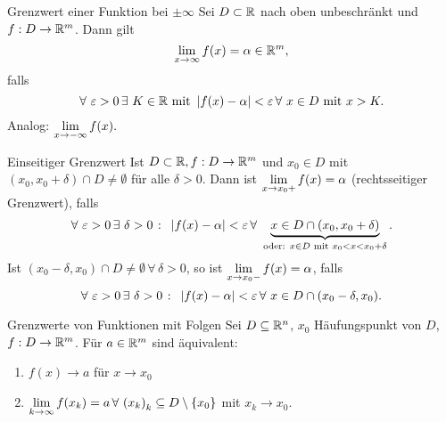 \documentclass[main.tex]{subfiles}
\begin{document}
\begin{karte}{Grenzwert einer Funktion bei \( \pm \infty \)}
    Sei \( D \subset \mathbb{R} \) nach oben unbeschränkt und 
    \( f:D\rightarrow \mathbb{R}^m \). Dann gilt 
    \[ \lim\limits_{x\rightarrow\infty} f(x) = \alpha \in \mathbb{R}^m, \]
    falls
    \[ \forall \,\varepsilon > 0 \,\exists \, K\in\R \text{ mit } 
    \abs{f(x) - \alpha} < \varepsilon \,\forall \, x \in D 
    \text{ mit } x > K. \]
    Analog: \( \lim\limits_{x\rightarrow -\infty} f(x). \)
\end{karte}
\begin{karte}{Einseitiger Grenzwert}
    Ist \( D \subset \mathbb{R}, f : D\rightarrow \mathbb{R}^m \) und \( x_0 \in D \)
    mit \( (x_0, x_0 + \delta) \cap D \neq \emptyset \) für alle 
    \( \delta > 0 \). Dann ist \( \lim\limits_{x\rightarrow x_0+} f(x) = \alpha \) 
    (rechtsseitiger Grenzwert), falls
    \[ \forall \,\varepsilon > 0 \,\exists \, \delta > 0 \;\colon \;
    \abs{ f(x) - \alpha } < \varepsilon \,\forall \, \underbrace{ x\in D \cap 
    (x_0, x_0 + \delta) }_{ \text{oder: } x\in D \text{ mit } 
    x_0 < x < x_0 + \delta }. \]
    Ist \( (x_0 - \delta, x_0) \cap D \neq \emptyset \,\forall \, 
    \delta > 0 \), so ist \( \lim\limits_{x\rightarrow x_0-} f(x) = \alpha \), falls
    \[ \forall \, \varepsilon > 0 \,\exists \, \delta > 0 \;\colon \; 
    \abs{f(x) - \alpha} < \varepsilon \,\forall \, x \in D \cap 
    (x_0 - \delta, x_0). \]
\end{karte}
\begin{karte}{Grenzwerte von Funktionen mit Folgen}
    Sei \( D \subseteq \mathbb{R}^n \), \(x_0 \) Häufungspunkt von 
    \( D \), \( f: D \rightarrow \mathbb{R}^m \). Für \( a\in \mathbb{R}^m \) 
    sind äquivalent:
    \begin{enumerate}
        \item \( f(x) \rightarrow a \) für \( x\rightarrow x_0 \)
        \item \( \limes{k} f(x_k) = a \,\forall \, {(x_k)}_k 
        \subseteq D \setminus \{x_0\} \) mit \( x_k \rightarrow x_0 \).
    \end{enumerate}
\end{karte}
\end{document}
